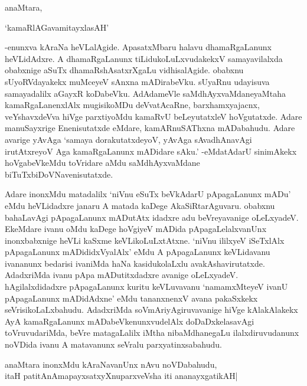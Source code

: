 anaMtara,

\begin{shloka}
`kamaRlAGavamitayxlasAH'
\end{shloka}

-enunxva kAraNa heVLalAgide. ApasatxMbaru halavu dhamaRgaLanunx heVLidAdxre. A dhamaRgaLanunx tiLidukoLuLxvudakekxV samayavilalxda obabxnige aSuTx dhamaRshAsatxrXgaLu vidhisalAgide. obabxnu sUyoRVdayakekx muMceyeV sAnxna mADirabeVku. sUyaRnu udayisuva samayadalilx aGayxR koDabeVku. AdAdameVle saMdhAyxvaMdaneyaMtaha kamaRgaLanenxlAlx mugisikoMDu deVvatAcaRne, barxhamxyajacnx, veYshavxdeVva hiVge parxtiyoMdu kamaRvU beLeyutatxleV hoVgutatxde. Adare manuSayxrige Enenisutatxde eMdare, kamARnuSAThxna mADabahudu. Adare avarige yAvAga `samaya dorakutatxdeyoV, yAvAga sAvadhAnavAgi irutAtxreyoV Aga kamaRgaLanunx mADidare sAku.' -eMdatAdarU sinimAkekx hoVgabeVkeMdu toVridare aMdu saMdhAyxvaMdane biTuTxbiDoVNavenisutatxde.

Adare inonxMdu matadalilx `niVnu eSuTx beVkAdarU pApagaLanunx mADu' eMdu heVLidadxre janaru A matada kaDege AkaSiRtarAguvaru. obabxnu bahaLavAgi pApagaLanunx mADutAtx idadxre adu beVreyavanige oLeLxyadeV. EkeMdare ivanu oMdu kaDege hoVgiyeV mADida pApagaLelalxvanUnx inonxbabxnige heVLi kaSxme keVLikoLuLxtAtxne. `niVnu ililxyeV iSeTxlAlx pApagaLanunx mADididxVyalAlx' eMdu A pApagaLanunx keVLidavanu ivananunx bedarisi ivaniMda haNa kasidukolaLxlu avakAshavirutatxde. AdadxriMda ivanu pApa mADutitxdadxre avanige oLeLxyadeV. hAgilalxdidadxre pApagaLanunx kuritu keVLuvavanu `namamxMteyeV ivanU pApagaLanunx mADidAdxne' eMdu tananxnenxV avana pakaSxkekx seVrisikoLaLxbahudu. AdadxriMda soVmAriyAgiruvavanige hiVge kAlakAlakekx AyA kamaRgaLanunx mADabeVkenunxvudelAlx doDaDxkelasavAgi toVruvudariMda, beVre matagaLalilx iMtha nibaMdhanegaLu ilalxdiruvudanunx noVDida ivanu A matavanunx seVralu parxyatinxsabahudu.

\begin{center}
anaMtara inonxMdu kAraNavanUnx nAvu noVDabahudu,\\
itaH patitAnAmapayxsatxyXnuparxveVsha iti ananayxgatikAH|
\end{center} 

